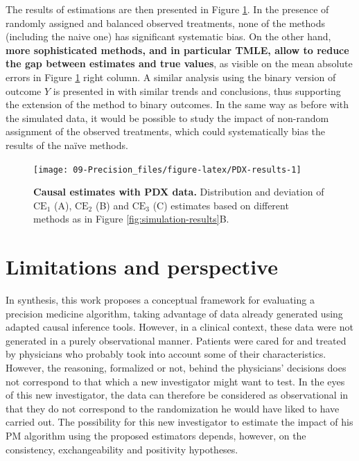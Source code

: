 \documentclass[a4paper,12pt,twoside,onecolumn,openright,final,oldfontcommands]{memoir}
\begin{document}
The results of estimations are then presented in Figure
\ref{fig:PDX-results}. In the presence of randomly assigned and balanced
observed treatments, none of the methods (including the naive one) has
significant systematic bias. On the other hand, \textbf{more
sophisticated methods, and in particular TMLE, allow to reduce the gap
between estimates and true values}, as visible on the mean absolute
errors in Figure \ref{fig:PDX-results} right column. A similar analysis
using the binary version of outcome \(Y\) is presented in
\citet{beal2020causal} with similar trends and conclusions, thus
supporting the extension of the method to binary outcomes. In the same
way as before with the simulated data, it would be possible to study the
impact of non-random assignment of the observed treatments, which could
systematically bias the results of the naïve methods.

\begin{figure}

{\centering \texttt{[image: 09-Precision\_files/figure-latex/PDX-results-1]} 

}

\caption[Causal estimates with PDX data]{\textbf{Causal estimates with PDX data.}
Distribution and deviation of \(\text{CE}_1\) (A), \(\text{CE}_2\) (B)
and \(\text{CE}_3\) (C) estimates based on different methods as in
Figure \ref{fig:simulation-results}B.}\label{fig:PDX-results}
\end{figure}






\section{Limitations and perspective}\label{limitations-and-perspective}

In synthesis, this work proposes a conceptual framework for evaluating a
precision medicine algorithm, taking advantage of data already generated
using adapted causal inference tools. However, in a clinical context,
these data were not generated in a purely observational manner. Patients
were cared for and treated by physicians who probably took into account
some of their characteristics. However, the reasoning, formalized or
not, behind the physicians' decisions does not correspond to that which
a new investigator might want to test. In the eyes of this new
investigator, the data can therefore be considered as observational in
that they do not correspond to the randomization he would have liked to
have carried out. The possibility for this new investigator to estimate
the impact of his PM algorithm using the proposed estimators depends,
however, on the consistency, exchangeability and positivity hypotheses.
\end{document}
